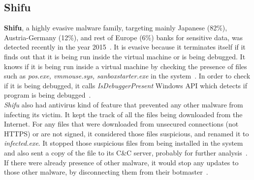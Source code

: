 \subsection{Shifu}
\label{sub:Shifu}
\textbf{Shifu}, a highly evasive malware family, targeting mainly Japanese (82\%), Austria-Germany (12\%), and rest of Europe (6\%) banks for sensitive data, was detected recently in the year 2015~\cite[]{secintelshifu}.
It is evasive because it terminates itself if it finds out that it is being run inside the virtual machine or is being debugged.
It knows if it is being run inside a virtual machine by checking the presence of files such as \emph{pos.exe, vmmouse.sys, sanboxstarter.exe} in the system~\cite[]{mccafeshifu}.
In order to check if it is being debugged, it calls \emph{IsDebuggerPresent} Windows API which detects if program is being debugged~\cite[]{mccafeshifu}.\\
\emph{Shifu} also had antivirus kind of feature that prevented any other malware from infecting its victim.
It kept the track of all the files being downloaded from the Internet.
For any files that were downloaded from unsecured connections (not HTTPS) or are not signed, it considered those files suspicious, and renamed it to \emph{infected.exe}.
It stopped those suspicious files from being installed in the system and also sent a copy of the file to its C\&C server, probably for further analysis~\cite[]{secintelshifu}.
If there were already presence of other malware, it would stop any updates to those other malware, by disconnecting them from their botmaster~\cite[]{secintelshifu}.
